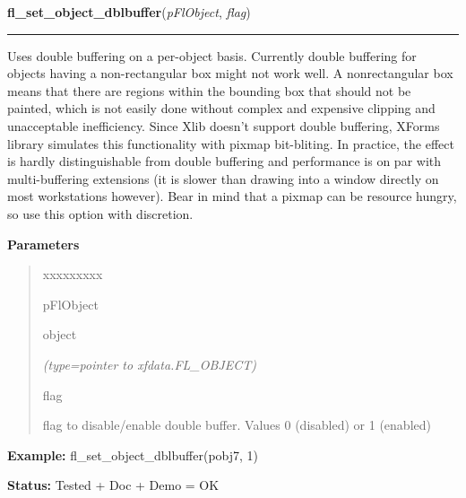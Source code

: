 \hspace{.8\funcindent}\begin{boxedminipage}{\funcwidth}

    \raggedright \textbf{fl\_set\_object\_dblbuffer}(\textit{pFlObject}, \textit{flag})

    \vspace{-1.5ex}

    \rule{\textwidth}{0.5\fboxrule}
\setlength{\parskip}{2ex}
    Uses double buffering on a per-object basis. Currently double buffering
    for objects having a non-rectangular box might not work well. A 
    nonrectangular box means that there are regions within the bounding box
    that should not be painted, which is not easily done without complex 
    and expensive clipping and unacceptable inefficiency. Since Xlib 
    doesn't support double buffering, XForms library simulates this 
    functionality with pixmap bit-bliting. In practice, the effect is 
    hardly distinguishable from double buffering and performance is on par 
    with multi-buffering extensions (it is slower than drawing into a 
    window directly on most workstations however). Bear in mind that a 
    pixmap can be resource hungry, so use this option with discretion.

\setlength{\parskip}{1ex}
      \textbf{Parameters}
      \vspace{-1ex}

      \begin{quote}
        \begin{Ventry}{xxxxxxxxx}

          \item[pFlObject]

          object

            {\it (type=pointer to xfdata.FL\_OBJECT)}

          \item[flag]

          flag to disable/enable double buffer. Values 0 (disabled) or 1 
          (enabled)

        \end{Ventry}

      \end{quote}

\textbf{Example:} fl\_set\_object\_dblbuffer(pobj7, 1)



\textbf{Status:} Tested + Doc + Demo = OK



    \end{boxedminipage}

